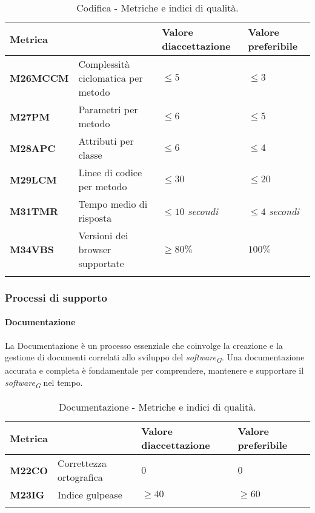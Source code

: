 \begin{longtable}{|C{1.9cm}|L{4cm}|L{2.2cm}|L{2.1cm}|}
    \hline
    \textbf{Metrica} &  & \textbf{Valore di\linebreak accettazione} & {\textbf{Valore \linebreak preferibile}} \\
    \hline \hline

    \textbf{M26MCCM} & Complessità ciclomatica per metodo & $\leq 5$ & $\leq 3$ \\
    \hline

    \textbf{M27PM} & Parametri per metodo & $\leq 6$ & $\leq 5$ \\
    \hline

    \textbf{M28APC} & Attributi per classe & $\leq 6$ & $\leq 4$ \\
    \hline

    \textbf{M29LCM} & Linee di codice per metodo & $\leq 30$ & $\leq 20$ \\
    \hline

    \textbf{M31TMR} & Tempo medio di risposta & $\leq 10$ \textit{secondi}  & $\leq 4$ \textit{secondi} \\
    \hline

    \textbf{M34VBS} & Versioni dei browser supportate & $\geq 80\%$ & $100\%$ \\
    \hline

    \caption{Codifica - Metriche e indici di qualità.}
    \label{tab:metriche}
\end{longtable}

\pagebreak

\subsubsection{Processi di supporto}

\paragraph{Documentazione}
La Documentazione è un processo essenziale che coinvolge la creazione e la gestione di documenti correlati allo sviluppo del \textit{software}\textsubscript{\textit{G}}. Una documentazione accurata e completa è fondamentale per comprendere, mantenere e supportare il \textit{software}\textsubscript{\textit{G}} nel tempo.

\begin{longtable}{|C{1.9cm}|L{4cm}|L{2.2cm}|L{2.1cm}|}
    \hline
    \textbf{Metrica} &  & \textbf{Valore di\linebreak accettazione} & {\textbf{Valore \linebreak preferibile}} \\
    \hline \hline

    \textbf{M22CO} & Correttezza ortografica & $0$ & $0$ \\
    \hline

    \textbf{M23IG} & Indice gulpease & $\geq 40$ & $\geq 60$ \\
    \hline

    \caption{Documentazione - Metriche e indici di qualità.}
    \label{tab:metriche_testo}
\end{longtable}

